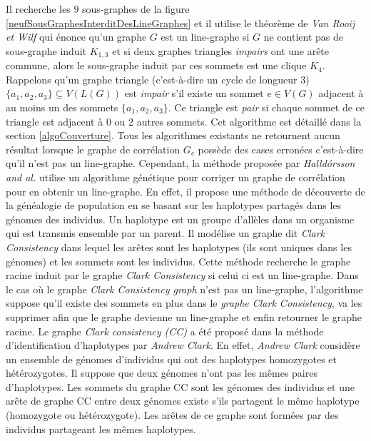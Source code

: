 Il recherche les $9$ sous-graphes de la figure \ref{neufSousGraphesInterditDesLineGraphes} et il utilise le th\'eor\`eme de {\em Van Rooij et Wilf} \cite{ROOIJetWILF1965interchange} qui \'enonce qu'un graphe $G$ est un line-graphe si $G$ ne contient pas de sous-graphe induit $K_{1,3}$ et si deux graphes triangles  {\em impairs} ont une ar\^ete commune, alors le sous-graphe induit par ces sommets est une clique $K_4$. 
Rappelons qu'un graphe triangle (c'est-\`a-dire un cycle de longueur $3$) $\{a_1,a_2,a_3\} \subseteq V(L(G))$ est {\em impair} s'il existe un sommet $e \in V(G)$ adjacent \`a  au moins un des sommets $\{a_1, a_2, a_3\}$. Ce triangle est {\em pair} si chaque sommet de ce triangle est adjacent \`a $0$ ou $2$ autres sommets. Cet algorithme est d\'etaill\'e dans la section \ref{algoCouverture}.
\newline
Tous les algorithmes existants ne retournent  aucun r\'esultat lorsque le graphe  de corr\'elation $G_c$ poss\`ede des cases erron\'ees c'est-\`a-dire qu'il n'est pas un line-graphe. 
Cependant, la m\'ethode propos\'ee par {\em Halld{\'o}rsson and al.} \cite{Halldorsson2013} 
utilise un algorithme g\'en\'etique pour corriger un graphe de corr\'elation pour en obtenir un line-graphe. 
En effet, il propose une m\'ethode de d\'ecouverte de la g\'en\'ealogie de population en se basant sur les haplotypes partag\'es dans les g\'enomes des individus.  
Un haplotype est un groupe d'all\`eles dans un organisme qui est transmis ensemble par un parent.
Il mod\'elise un graphe dit {\em Clark Consistency} \cite{halldorsson2011clark} dans lequel les ar\^etes sont les haplotypes (ils sont uniques dans les g\'enomes) et les sommets sont les individus.
Cette m\'ethode recherche le graphe racine induit par le graphe {\em Clark Consistency} si celui ci est un line-graphe. Dans le cas o\`u le graphe {\em Clark Consistency graph} n'est pas un line-graphe, l'algorithme suppose qu'il existe des sommets en plus dans le {\em graphe Clark Consistency}, va les supprimer afin que le graphe devienne un line-graphe et enfin retourner le graphe racine.     
Le graphe {\em Clark consistency (CC)} a \'et\'e propos\'e dans  la m\'ethode d'identification d'haplotypes par {\em Andrew Clark}. 
En effet, {\em Andrew Clark} consid\`ere un ensemble de g\'enomes d'individus qui ont des haplotypes homozygotes et h\'et\'erozygotes. Il suppose que deux g\'enomes n'ont pas les m\^emes paires d'haplotypes. Les sommets du graphe CC sont les g\'enomes des individus et une ar\^ete de graphe CC entre deux g\'enomes existe s'ils partagent le m\^eme haplotype (homozygote ou h\'et\'erozygote). Les ar\^etes de ce graphe sont form\'ees par des individus partageant les m\^emes haplotypes. 
